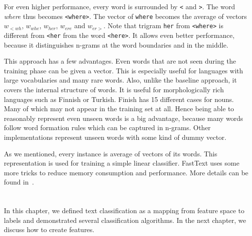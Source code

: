 For even higher performance, every word is surrounded by \texttt{<} and \texttt{>}.
The word \textit{ where} thus becomes \texttt{<where>}.
The vector of \texttt{where} becomes the average of vectors
$w_{<wh}$, 
$w_{whe}$, 
$w_{her}$,
$w_{ere}$ and
$w_{er>}$.
Note that trigram {\tt her} from \texttt{<where>} is different from {\tt <her} from the word {\tt <here>}.
It allows even better performance, because it distinguishes n-grams at the word boundaries and in the middle.

This approach has a few advantages.
Even words that are not seen during the training phase can be given a vector.
This is especially useful for languages with large vocabularies and many rare words.
Also, unlike the baseline approach, it covers the internal structure of words.
It is useful for morphologically rich languages such as Finnish or Turkish.
Finish has 15 different cases for nouns.
Many of which may not appear in the training set at all.
Hence being able to reasonably represent even unseen words is a big advantage,
because many words follow word formation rules which can be captured in n-grams.
Other implementations represent unseen words with some kind of dummy vector.

As we mentioned, every instance is average of vectors of its words.
This representation is used for training a simple linear classifier.
FastText uses some more tricks to reduce memory consumption and performance.
More details can be found in~\citet{Joulin2017bag}.



\subsubsection{}

\subsection{}

\subsection{}


\section{}

In this chapter, we defined text classification as a mapping from feature space to labels
and demonstrated several classification algorithms.
In the next chapter, we discuss how to create features.
